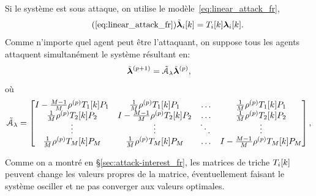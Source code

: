 \documentclass[../main.tex]{subfiles}
\begin{document}
Si le système est sous attaque, on utilise le modèle~\eqref{eq:linear_attack_fr},
\begin{equation}
  \label{eq:linear_attack_reprise_fr}
  \tag{\ref*{eq:linear_attack_fr}}
  \lambdaicheat[k]=\Tik\lambdaik.
\end{equation}
Comme n'importe quel agent peut être l'attaquant, on suppose tous les agents attaquent simultanément le système résultant en:
\begin{equation}
  \label{eq:negotiation_equation_substituting_organizing_under_attack_fr}
  \tilde{\boldsymbol{\lambda}}^{(p+1)}=\tilde{\mathcal{A}}_{\lambda}\tilde{\boldsymbol{\lambda}}^{(p)},
\end{equation}
où
\begin{equation}
\tilde{\mathcal{A}}_{\lambda}=\left[
\begin{matrix}
I-\frac{M-1}{M}\rho\p \Tik[1]\Plin[1] & \frac{1}{M}\rho\p \Tik[1]\Plin[1]&\dots&\frac{1}{M}\rho\p \Tik[1]\Plin[1]\\
\frac{1}{M}\rho\p \Tik[2]\Plin[2]&I-\frac{M-1}{M}\rho\p \Tik[2]\Plin[2]&\dots&\frac{1}{M}\rho\p \Tik[2]\Plin[2]\\
\vdots&\vdots&\ddots&\vdots\\
\frac{1}{M}\rho\p \Tik[M]\Plin[M]&\frac{1}{M}\rho\p \Tik[M]\Plin[M]&\dots&I-\frac{M-1}{M}\rho\p \Tik[M]\Plin[M]\\
\end{matrix}
\right],
\end{equation}

Comme on a montré en \S\ref{sec:attack-interest_fr}, les matrices de triche $T_{i}[k]$ peuvent change les valeurs propres de la matrice, éventuellement faisant le système osciller et ne pas converger aux valeurs optimales.
\end{document}
